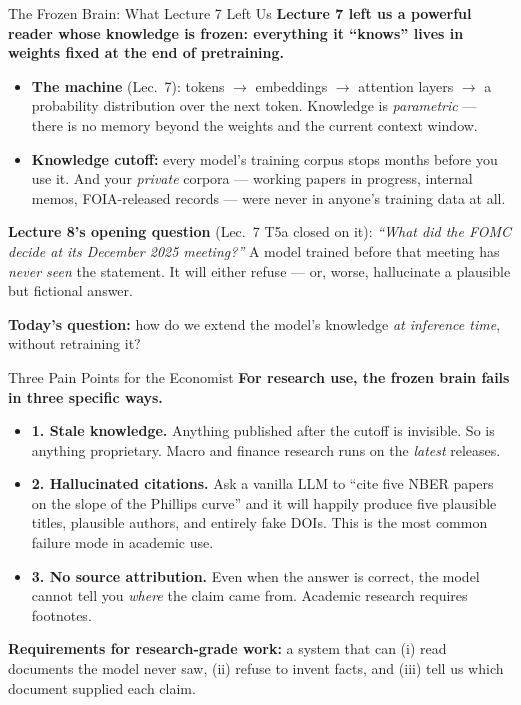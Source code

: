 \begin{frame}{The Frozen Brain: What Lecture 7 Left Us}
\textbf{Lecture 7 left us a powerful reader whose knowledge is frozen: everything it ``knows'' lives in weights fixed at the end of pretraining.}

\medskip
\begin{itemize}
\item \textbf{The machine} (Lec.\ 7): tokens $\to$ embeddings $\to$ attention layers $\to$ a probability distribution over the next token. Knowledge is \emph{parametric} --- there is no memory beyond the weights and the current context window.

\medskip
\item \textbf{Knowledge cutoff:} every model's training corpus stops months before you use it. And your \emph{private} corpora --- working papers in progress, internal memos, FOIA-released records --- were never in anyone's training data at all.
\end{itemize}

\medskip
\begin{examplebox}
\textbf{Lecture 8's opening question} (Lec.\ 7 T5a closed on it): \emph{``What did the FOMC decide at its December 2025 meeting?''} A model trained before that meeting has \emph{never seen} the statement. It will either refuse --- or, worse, hallucinate a plausible but fictional answer.
\end{examplebox}

\medskip
\textbf{Today's question:} how do we extend the model's knowledge \emph{at inference time}, without retraining it?
\end{frame}

\begin{frame}{Three Pain Points for the Economist}
\textbf{For research use, the frozen brain fails in three specific ways.}

\medskip
\begin{itemize}
\item \textbf{1. Stale knowledge.} Anything published after the cutoff is invisible. So is anything proprietary. Macro and finance research runs on the \emph{latest} releases.

\medskip
\item \textbf{2. Hallucinated citations.} Ask a vanilla LLM to ``cite five NBER papers on the slope of the Phillips curve'' and it will happily produce five plausible titles, plausible authors, and entirely fake DOIs. This is the most common failure mode in academic use.

\medskip
\item \textbf{3. No source attribution.} Even when the answer is correct, the model cannot tell you \emph{where} the claim came from. Academic research requires footnotes.
\end{itemize}

\medskip
\begin{takeawaybox}
\textbf{Requirements for research-grade work:} a system that can (i) read documents the model never saw, (ii) refuse to invent facts, and (iii) tell us which document supplied each claim.
\end{takeawaybox}
\end{frame}

